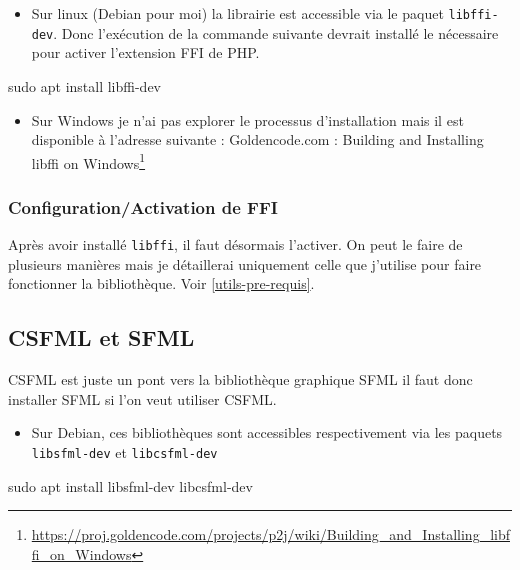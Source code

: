 \documentclass[11pt,a4paper,krantz2,11pt,oneside]{krantz}
\newenvironment{Shaded}{\begin{snugshade}}{\end{snugshade}}
\newcommand{\FunctionTok}[1]{\textcolor[rgb]{0,0,0}{#1}}
\newcommand{\NormalTok}[1]{#1}
\providecommand{\tightlist}{%
  \setlength{\itemsep}{0pt}\setlength{\parskip}{0pt}}
\renewcommand{\href}[2]{#2\footnote{\url{#1}}}
\begin{document}
\begin{itemize}
\tightlist
\item
  Sur linux (Debian pour moi) la librairie est accessible via le paquet \texttt{libffi-dev}. Donc l'exécution de la commande suivante devrait installé le nécessaire pour activer l'extension FFI de PHP.
\end{itemize}

\begin{Shaded}
\begin{Highlighting}[]
\FunctionTok{sudo}\NormalTok{ apt install libffi-dev}
\end{Highlighting}
\end{Shaded}

\begin{itemize}
\tightlist
\item
  Sur Windows je n'ai pas explorer le processus d'installation mais il est disponible à l'adresse suivante : \href{https://proj.goldencode.com/projects/p2j/wiki/Building_and_Installing_libffi_on_Windows}{Goldencode.com : Building and Installing libffi on Windows}
\end{itemize}

\hypertarget{configurationactivation-de-ffi}{%
\subsubsection{Configuration/Activation de FFI}\label{configurationactivation-de-ffi}}

Après avoir installé \texttt{libffi}, il faut désormais l'activer. On peut le faire de plusieurs manières mais je détaillerai uniquement celle que j'utilise pour faire fonctionner la bibliothèque. Voir \ref{utils-pre-requis}.

\hypertarget{csfml-et-sfml}{%
\subsection{CSFML et SFML}\label{csfml-et-sfml}}

CSFML est juste un pont vers la bibliothèque graphique SFML il faut donc installer SFML si l'on veut utiliser CSFML.

\begin{itemize}
\tightlist
\item
  Sur Debian, ces bibliothèques sont accessibles respectivement via les paquets \texttt{libsfml-dev} et \texttt{libcsfml-dev}
\end{itemize}

\begin{Shaded}
\begin{Highlighting}[]
\FunctionTok{sudo}\NormalTok{ apt install libsfml-dev libcsfml-dev}
\end{Highlighting}
\end{Shaded}
\end{document}
